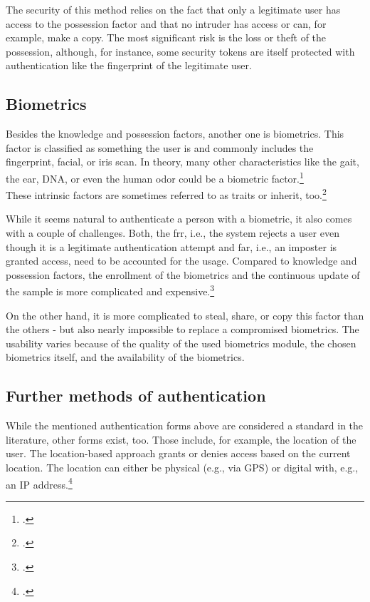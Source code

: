 The security of this method relies on the fact that only a legitimate user has access to the possession factor and that no intruder has access or can, for example, make a copy. The most significant risk is the loss or theft of the possession, although, for instance, some security tokens are itself protected with authentication like the fingerprint of the legitimate user.

\subsection{Biometrics}

Besides the knowledge and possession factors, another one is biometrics. This factor is classified as \frqq something the user is\flqq{} and commonly includes the fingerprint, facial, or iris scan. In theory, many other characteristics like the gait, the ear, DNA, or even the human odor could be a biometric factor.\footcite[See][30--34]{Jain2011}\\
These intrinsic factors are sometimes referred to as traits or inherit, too.\footcite[See][186]{dasgupta2017multi}

While it seems natural to authenticate a person with a biometric, it also comes with a couple of challenges. Both, the \gls{frr}, i.e., the system rejects a user even though it is a legitimate authentication attempt and \gls{far}, i.e., an imposter is granted access, need to be accounted for the usage. Compared to knowledge and possession factors, the enrollment of the biometrics and the continuous update of the sample is more complicated and expensive.\footcites[See][18--24]{Jain2011}[See][34--37]{265831}

On the other hand, it is more complicated to steal, share, or copy this factor than the others - but also nearly impossible to replace a compromised biometrics. The usability varies because of the quality of the used biometrics module, the chosen biometrics itself, and the availability of the biometrics.

\subsection{Further methods of authentication}

While the mentioned authentication forms above are considered a standard in the literature, other forms exist, too. Those include, for example, the location of the user. The location-based approach grants or denies access based on the current location. The location can either be physical (e.g., via GPS) or digital with, e.g., an IP address.\footcite{6296127}

